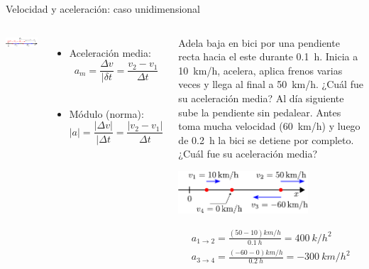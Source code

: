 \documentclass[9pt, aspectratio=169]{beamer}
\begin{document}
\begin{frame}{Velocidad y aceleración: caso unidimensional}
\begin{columns}
\cx
\begin{center}
    \includegraphics[width=1.0\textwidth]{figs/fig-06.pdf}
\end{center}
\begin{itemize}
    \item Aceleración media:
        \[ a_m = \frac{\Delta v}{|\delta t} = \frac{v_2 - v_1}{\Delta t} \] \\
        \item Módulo (norma): 
            \[ |a|  = \frac{|\Delta v|}{|\Delta t} = \frac{|v_2 - v_1|}{\Delta t} \]
    \end{itemize}
    \cx
    \begin{example}
        { \small Adela baja en bici por una pendiente recta hacia el este durante \qty{0.1}{h}. Inicia a \qty{10}{km/h}, acelera, aplica frenos varias veces y llega al final a \qty{50}{km/h}. ¿Cuál fue su aceleración media? Al día siguiente sube la pendiente sin pedalear. Antes toma mucha velocidad (\qty{60}{km/h}) y luego de \qty{0.2}{h} la bici se detiene por completo. ¿Cuál fue su aceleración media? }
        \begin{center}
            \includegraphics[width=0.7\textwidth]{figs/fig-07.pdf}
        \end{center}
        \begin{align*}
            a_{1 \rightarrow 2} = \frac{(\num{50} - \num{10})\unit{km/h}}{\qty{0.1}{h}} = \qty{400}{k/h^2} \\
            a_{3 \rightarrow 4} = \frac{(\num{-60} - \num{0}) \unit{km/h}}{\qty{0.2}{h}} = \qty{-300}{km/h^2}
        \end{align*}
    \end{example}
    \end{columns}
\end{frame}
\end{document}
